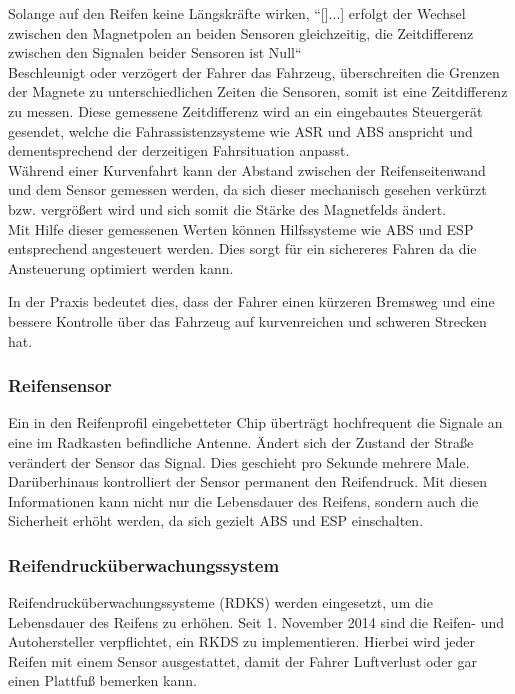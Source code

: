 	                Solange auf den Reifen keine Längskräfte wirken, ``[]...] erfolgt der Wechsel zwischen den Magnetpolen an beiden Sensoren gleichzeitig, die Zeitdifferenz zwischen den Signalen beider Sensoren ist Null`` \cite{TS_swt} \\	
	                Beschleunigt oder verzögert der Fahrer das Fahrzeug, überschreiten die Grenzen der Magnete zu unterschiedlichen Zeiten die Sensoren, somit ist eine Zeitdifferenz zu messen. 
	                Diese gemessene Zeitdifferenz wird an ein eingebautes Steuergerät gesendet, welche die Fahrassistenzsysteme wie ASR und ABS anspricht und dementsprechend der derzeitigen Fahrsituation anpasst.\\
	                
					Während einer Kurvenfahrt kann der Abstand zwischen der Reifenseitenwand und dem Sensor gemessen werden, da sich dieser mechanisch gesehen verkürzt bzw. vergrößert wird und sich somit die Stärke des Magnetfelds ändert.\\
	                Mit Hilfe dieser gemessenen Werten können Hilfssysteme wie ABS und ESP entsprechend angesteuert werden. Dies sorgt für ein sichereres Fahren da die Ansteuerung optimiert werden kann. 
	                
	                In der Praxis bedeutet dies, dass der Fahrer einen kürzeren Bremsweg und eine bessere Kontrolle über das Fahrzeug auf kurvenreichen und schweren Strecken hat.
	
	                \subsubsection{Reifensensor}
	
	                Ein in den Reifenprofil eingebetteter Chip überträgt hochfrequent die Signale an eine im Radkasten befindliche Antenne. 
	                Ändert sich der Zustand der Straße verändert der Sensor das Signal. Dies geschieht pro Sekunde mehrere Male. 
	                Darüberhinaus kontrolliert der Sensor permanent den Reifendruck. Mit diesen Informationen kann nicht nur die Lebensdauer des Reifens, sondern auch die Sicherheit erhöht werden, 
	                da sich gezielt ABS und ESP einschalten.\\ 
				
	                \subsubsection{Reifendrucküberwachungssystem}
	                Reifendrucküberwachungssysteme (RDKS) werden eingesetzt, um die Lebensdauer des Reifens zu erhöhen. Seit 1. November 2014 sind die Reifen- und Autohersteller verpflichtet, ein RKDS zu implementieren.
	                Hierbei wird jeder Reifen mit einem Sensor ausgestattet, damit der Fahrer Luftverlust oder gar einen Plattfuß bemerken kann.
	                
